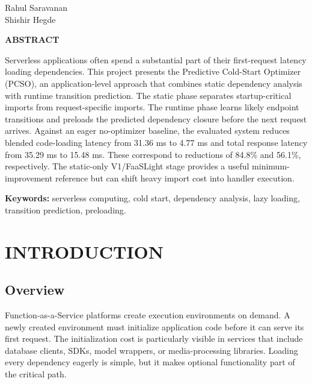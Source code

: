 \documentclass[12pt]{report}
\begin{document}
\vfill
\begin{flushright}
Rahul Saravanan\\
Shishir Hegde
\end{flushright}

\clearpage
{}
\begin{center}\textbf{\Large ABSTRACT}\end{center}
\justifying
Serverless applications often spend a substantial part of their first-request latency loading dependencies. This project presents the Predictive Cold-Start Optimizer (PCSO), an application-level approach that combines static dependency analysis with runtime transition prediction. The static phase separates startup-critical imports from request-specific imports. The runtime phase learns likely endpoint transitions and preloads the predicted dependency closure before the next request arrives. Against an eager no-optimizer baseline, the evaluated system reduces blended code-loading latency from 31.36 ms to 4.77 ms and total response latency from 35.29 ms to 15.48 ms. These correspond to reductions of 84.8\% and 56.1\%, respectively. The static-only V1/FaaSLight stage provides a useful minimum-improvement reference but can shift heavy import cost into handler execution.

\vspace{0.5em}
\textbf{Keywords:} serverless computing, cold start, dependency analysis, lazy loading, transition prediction, preloading.

\clearpage
\renewcommand*{\contentsname}{CONTENTS}
\renewcommand*{\listfigurename}{LIST OF FIGURES}
\renewcommand*{\listtablename}{LIST OF TABLES}
\tableofcontents
\clearpage
\listoffigures
\clearpage
\listoftables
\clearpage
{}

\chapter{INTRODUCTION}
\section{Overview}
Function-as-a-Service platforms create execution environments on demand. A newly created environment must initialize application code before it can serve its first request. The initialization cost is particularly visible in services that include database clients, SDKs, model wrappers, or media-processing libraries. Loading every dependency eagerly is simple, but it makes optional functionality part of the critical path.
\end{document}
